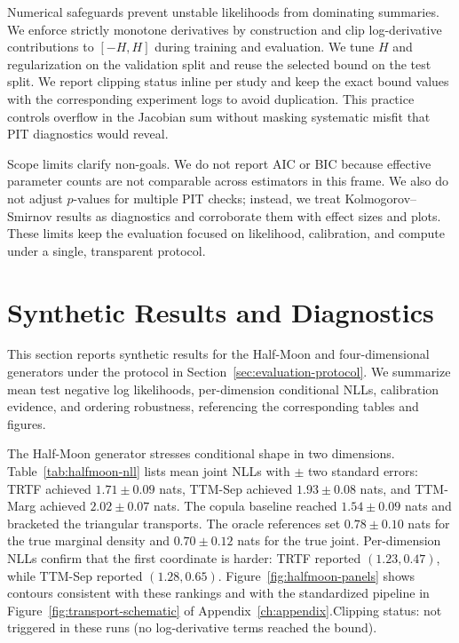 \documentclass[11pt,a4paper,twoside]{book}\usepackage[]{graphicx}\usepackage[]{xcolor}
\begin{document}
Numerical safeguards prevent unstable likelihoods from dominating summaries. We enforce strictly monotone derivatives by construction and clip log-derivative contributions to $[-H, H]$ during training and evaluation. We tune $H$ and regularization on the validation split and reuse the selected bound on the test split. We report clipping status inline per study and keep the exact bound values with the corresponding experiment logs to avoid duplication. This practice controls overflow in the Jacobian sum without masking systematic misfit that PIT diagnostics would reveal.

Scope limits clarify non-goals. We do not report AIC or BIC because effective parameter counts are not comparable across estimators in this frame. We also do not adjust $p$-values for multiple PIT checks; instead, we treat Kolmogorov--Smirnov results as diagnostics and corroborate them with effect sizes and plots. These limits keep the evaluation focused on likelihood, calibration, and compute under a single, transparent protocol.

\section{Synthetic Results and Diagnostics}\label{sec:synthetic-results}

This section reports synthetic results for the Half-Moon and four-dimensional generators under the protocol in Section~\ref{sec:evaluation-protocol}. We summarize mean test negative log likelihoods, per-dimension conditional NLLs, calibration evidence, and ordering robustness, referencing the corresponding tables and figures.

The Half-Moon generator stresses conditional shape in two dimensions. Table~\ref{tab:halfmoon-nll} lists mean joint NLLs with $\pm$ two standard errors: TRTF achieved $1.71 \pm 0.09$ nats, TTM-Sep achieved $1.93 \pm 0.08$ nats, and TTM-Marg achieved $2.02 \pm 0.07$ nats. The copula baseline reached $1.54 \pm 0.09$ nats and bracketed the triangular transports. The oracle references set $0.78 \pm 0.10$ nats for the true marginal density and $0.70 \pm 0.12$ nats for the true joint. Per-dimension NLLs confirm that the first coordinate is harder: TRTF reported $(1.23, 0.47)$, while TTM-Sep reported $(1.28, 0.65)$. Figure~\ref{fig:halfmoon-panels} shows contours consistent with these rankings and with the standardized pipeline in Figure~\ref{fig:transport-schematic} of Appendix~\ref{ch:appendix}.\;Clipping status: not triggered in these runs (no log-derivative terms reached the bound).
\end{document}
